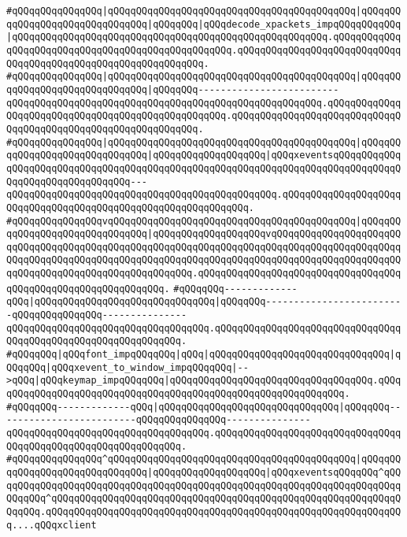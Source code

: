 \verb|#qQQqqQQqqQQqqQQq|\verb#|qQQqqQQqqQQqqQQqqQQqqQQqqQQqqQQqqQQqqQQqqQQq|qQQqqQQqqQQqqQQqqQQqqQQqqQQqqQQq|qQQqqQQq|qQQqdecode_xpackets_impqQQqqQQqqQQq|qQQqqQQqqQQqqQQqqQQqqQQqqQQqqQQqqQQqqQQqqQQqqQQqqQQqqQQq.qQQqqQQqqQQqqQQqqQQqqQQqqQQqqQQqqQQqqQQqqQQqqQQqqQQq.qQQqqQQqqQQqqQQqqQQqqQQqqQQqqQQqqQQqqQQqqQQqqQQqqQQqqQQqqQQqqQQq.#\newline
\verb|#qQQqqQQqqQQqqQQq|\verb#|qQQqqQQqqQQqqQQqqQQqqQQqqQQqqQQqqQQqqQQqqQQq|qQQqqQQqqQQqqQQqqQQqqQQqqQQqqQQq|qQQqqQQq-------------------------qQQqqQQqqQQqqQQqqQQqqQQqqQQqqQQqqQQqqQQqqQQqqQQqqQQqqQQq.qQQqqQQqqQQqqQQqqQQqqQQqqQQqqQQqqQQqqQQqqQQqqQQqqQQq.qQQqqQQqqQQqqQQqqQQqqQQqqQQqqQQqqQQqqQQqqQQqqQQqqQQqqQQqqQQqqQQq.#\newline
\verb|#qQQqqQQqqQQqqQQq|\verb#|qQQqqQQqqQQqqQQqqQQqqQQqqQQqqQQqqQQqqQQqqQQq|qQQqqQQqqQQqqQQqqQQqqQQqqQQqqQQq|qQQqqQQqqQQqqQQqqQQq|qQQqxeventsqQQqqQQqqQQqqQQqqQQqqQQqqQQqqQQqqQQqqQQqqQQqqQQqqQQqqQQqqQQqqQQqqQQqqQQqqQQqqQQqqQQqqQQqqQQqqQQqqQQqqQQq---qQQqqQQqqQQqqQQqqQQqqQQqqQQqqQQqqQQqqQQqqQQqqQQq.qQQqqQQqqQQqqQQqqQQqqQQqqQQqqQQqqQQqqQQqqQQqqQQqqQQqqQQqqQQqqQQq.#\newline
\verb|#qQQqqQQqqQQqqQQqvqQQqqQQqqQQqqQQqqQQqqQQqqQQqqQQqqQQqqQQqqQQq|\verb#|qQQqqQQqqQQqqQQqqQQqqQQqqQQqqQQq|qQQqqQQqqQQqqQQqqQQqvqQQqqQQqqQQqqQQqqQQqqQQqqQQqqQQqqQQqqQQqqQQqqQQqqQQqqQQqqQQqqQQqqQQqqQQqqQQqqQQqqQQqqQQqqQQqqQQqqQQqqQQqqQQqqQQqqQQqqQQqqQQqqQQqqQQqqQQqqQQqqQQqqQQqqQQqqQQqqQQqqQQqqQQqqQQqqQQqqQQqqQQqqQQqqQQqqQQq.qQQqqQQqqQQqqQQqqQQqqQQqqQQqqQQqqQQqqQQqqQQqqQQqqQQqqQQqqQQqqQQq.#\newline
\verb|#qQQqqQQq-------------qQQq|\verb#|qQQqqQQqqQQqqQQqqQQqqQQqqQQqqQQq|qQQqqQQq-------------------------qQQqqQQqqQQqqQQq---------------qQQqqQQqqQQqqQQqqQQqqQQqqQQqqQQqqQQq.qQQqqQQqqQQqqQQqqQQqqQQqqQQqqQQqqQQqqQQqqQQqqQQqqQQqqQQqqQQqqQQq.#\newline
\verb|#qQQqqQQq|\verb#|qQQqfont_impqQQqqQQq|qQQq|qQQqqQQqqQQqqQQqqQQqqQQqqQQqqQQq|qQQqqQQq|qQQqxevent_to_window_impqQQqqQQq|-->qQQq|qQQqkeymap_impqQQqqQQq|qQQqqQQqqQQqqQQqqQQqqQQqqQQqqQQqqQQq.qQQqqQQqqQQqqQQqqQQqqQQqqQQqqQQqqQQqqQQqqQQqqQQqqQQqqQQqqQQqqQQq.#\newline
\verb|#qQQqqQQq-------------qQQq|\verb#|qQQqqQQqqQQqqQQqqQQqqQQqqQQqqQQq|qQQqqQQq-------------------------qQQqqQQqqQQqqQQq---------------qQQqqQQqqQQqqQQqqQQqqQQqqQQqqQQqqQQq.qQQqqQQqqQQqqQQqqQQqqQQqqQQqqQQqqQQqqQQqqQQqqQQqqQQqqQQqqQQqqQQq.#\newline
\verb|#qQQqqQQqqQQqqQQq^qQQqqQQqqQQqqQQqqQQqqQQqqQQqqQQqqQQqqQQqqQQq|\verb#|qQQqqQQqqQQqqQQqqQQqqQQqqQQqqQQq|qQQqqQQqqQQqqQQqqQQq|qQQqxeventsqQQqqQQq^qQQqqQQqqQQqqQQqqQQqqQQqqQQqqQQqqQQqqQQqqQQqqQQqqQQqqQQqqQQqqQQqqQQqqQQqqQQqqQQq^qQQqqQQqqQQqqQQqqQQqqQQqqQQqqQQqqQQqqQQqqQQqqQQqqQQqqQQqqQQqqQQqqQQq.qQQqqQQqqQQqqQQqqQQqqQQqqQQqqQQqqQQqqQQqqQQqqQQqqQQqqQQqqQQqqQQq....qQQqxclient#\newline
